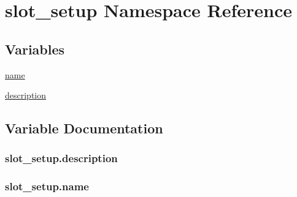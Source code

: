 \hypertarget{namespaceslot__setup}{}\section{slot\+\_\+setup Namespace Reference}
\label{namespaceslot__setup}
\subsection*{Variables}
\begin{DoxyCompactItemize}
\item 
\hyperlink{namespaceslot__setup_a52d7784b6c3ec3a9e93493bbfab4584a}{name}
\item 
\hyperlink{namespaceslot__setup_acf1ccc2c43f0d92a3c9ce7b0fe8ddab8}{description}
\end{DoxyCompactItemize}


\subsection{Variable Documentation}
\subsubsection[{\texorpdfstring{description}{description}}]{\setlength{\rightskip}{0pt plus 5cm}slot\+\_\+setup.\+description}\hypertarget{namespaceslot__setup_acf1ccc2c43f0d92a3c9ce7b0fe8ddab8}{}\label{namespaceslot__setup_acf1ccc2c43f0d92a3c9ce7b0fe8ddab8}
\subsubsection[{\texorpdfstring{name}{name}}]{\setlength{\rightskip}{0pt plus 5cm}slot\+\_\+setup.\+name}\hypertarget{namespaceslot__setup_a52d7784b6c3ec3a9e93493bbfab4584a}{}\label{namespaceslot__setup_a52d7784b6c3ec3a9e93493bbfab4584a}
